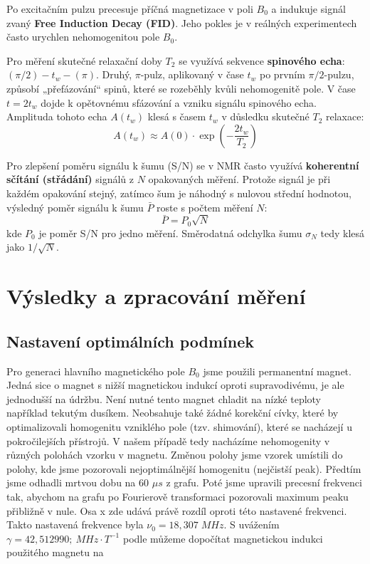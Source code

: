 Po excitačním pulzu precesuje příčná magnetizace v poli $B_0$ a indukuje signál zvaný \textbf{Free Induction Decay (FID)}. Jeho pokles je v reálných experimentech často urychlen nehomogenitou pole $B_0$.

Pro měření skutečné relaxační doby $T_2$ se využívá sekvence \textbf{spinového echa}: $(\pi/2) - t_w - (\pi)$. Druhý, $\pi$-pulz, aplikovaný v čase $t_w$ po prvním $\pi/2$-pulzu, způsobí „přefázování“ spinů, které se rozeběhly kvůli nehomogenitě pole. V čase $t = 2t_w$ dojde k opětovnému sfázování a vzniku signálu spinového echa. Amplituda tohoto echa $A(t_w)$ klesá s časem $t_w$ v důsledku skutečné $T_2$ relaxace:
\begin{equation} \label{eq:echo_amp}
A(t_w) \approx A(0) \cdot \exp\left(-\frac{2t_w}{T_2}\right) \tag{15}
\end{equation}


Pro zlepšení poměru signálu k šumu (S/N) se v NMR často využívá \textbf{koherentní sčítání (střádání)} signálů z $N$ opakovaných měření. Protože signál je při každém opakování stejný, zatímco šum je náhodný s nulovou střední hodnotou, výsledný poměr signálu k šumu $\bar{P}$ roste s počtem měření $N$:
\begin{equation} \label{eq:SN_avg}
\bar{P} = P_0 \sqrt{N} \tag{22}
\end{equation}
kde $P_0$ je poměr S/N pro jedno měření. Směrodatná odchylka šumu $\sigma_N$ tedy klesá jako $1/\sqrt{N}$.

\section{Výsledky a zpracování měření}

\subsection{Nastavení optimálních podmínek}
Pro generaci hlavního magnetického pole $B_0$ jsme použili permanentní magnet. Jedná sice o magnet s nižší magnetickou indukcí oproti supravodivému, je ale jednodušší na údržbu. Není nutné tento magnet chladit na nízké teploty například tekutým dusíkem. Neobsahuje také žádné korekční cívky, které by optimalizovali homogenitu vzniklého pole (tzv. shimování), které se nacházejí u pokročilejších přístrojů. V našem případě tedy nacházíme nehomogenity v různých polohách vzorku v magnetu. Změnou polohy jsme vzorek umístili do polohy, kde jsme pozorovali nejoptimálnější homogenitu (nejčistší peak). Předtím jsme odhadli mrtvou dobu na 60 $\mu s$ z grafu. Poté jsme upravili precesní frekvenci tak, abychom na grafu po Fourierově transformaci pozorovali maximum peaku přibližně v nule. Osa x zde udává právě rozdíl oproti této nastavené frekvenci. Takto nastavená frekvence byla $\nu_0 = 18,307 \; MHz$. S uvážením $\gamma = 42,512990 ;\ MHz \cdot T^{-1}$ podle \cite{bib:zadani} můžeme dopočítat magnetickou indukci použitého magnetu na

